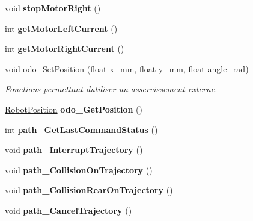 \begin{DoxyCompactItemize}
void {\bfseries stop\+Motor\+Right} ()
\item 
\mbox{\label{classAsservDriver_ab93d873dc060cff42befa9e50a4a0b32}} 
int {\bfseries get\+Motor\+Left\+Current} ()
\item 
\mbox{\label{classAsservDriver_ace1b02fcab067c77ee71a134614ace50}} 
int {\bfseries get\+Motor\+Right\+Current} ()
\item 
\mbox{\label{classAsservDriver_a5806e26618e1b2a4590b67ba55a55165}} 
void \hyperlink{classAsservDriver_a5806e26618e1b2a4590b67ba55a55165}{odo\+\_\+\+Set\+Position} (float x\+\_\+mm, float y\+\_\+mm, float angle\+\_\+rad)
\begin{DoxyCompactList}\small\item\em Fonctions permettant d\textquotesingle{}utiliser un asservissement externe. \end{DoxyCompactList}\item 
\mbox{\label{classAsservDriver_a0a62fbec28bfc5510eb75b6ad434baed}} 
\hyperlink{structRobotPosition}{Robot\+Position} {\bfseries odo\+\_\+\+Get\+Position} ()
\item 
\mbox{\label{classAsservDriver_ac4b8627777e76c145265a8e988852484}} 
int {\bfseries path\+\_\+\+Get\+Last\+Command\+Status} ()
\item 
\mbox{\label{classAsservDriver_affc4e315cdd03c826cea17114d02a19c}} 
void {\bfseries path\+\_\+\+Interrupt\+Trajectory} ()
\item 
\mbox{\label{classAsservDriver_a6af616f39706df060f1b81b2047c7a7f}} 
void {\bfseries path\+\_\+\+Collision\+On\+Trajectory} ()
\item 
\mbox{\label{classAsservDriver_a370b2f287b352211c07a023edcb63bc7}} 
void {\bfseries path\+\_\+\+Collision\+Rear\+On\+Trajectory} ()
\item 
\mbox{\label{classAsservDriver_a7f18af77a8524e09f8c9b024d4f0e4b8}} 
void {\bfseries path\+\_\+\+Cancel\+Trajectory} ()
\item 
\mbox{\label{classAsservDriver_aa54769b7bbe83fefa64925aa60089096}} 

\end{DoxyCompactItemize}
